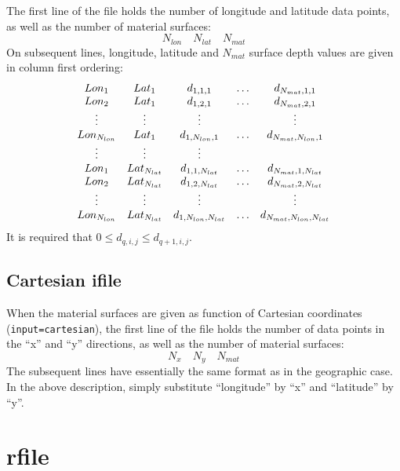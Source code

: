 \documentclass[11pt]{report}
\begin{document}
The first line of the file holds the number of longitude and latitude data points, as well as the number
of material surfaces:
\[
N_{lon}\quad N_{lat}\quad N_{mat}
\]
On subsequent lines, longitude, latitude and $N_{mat}$ surface depth values are given in column
first ordering:
\[
\begin{array}{c c c c c}
Lon_1 & Lat_1          & d_{1,1,1} & \ldots & d_{N_{mat},1,1}\\
Lon_2& Lat_1           & d_{1,2,1} & \ldots & d_{N_{mat},2,1}\\
\vdots&\vdots&\vdots & & \vdots\\
Lon_{N_{lon}}& Lat_1      & d_{1,N_{lon},1} & \ldots & d_{N_{mat},N_{lon},1}\\
\vdots&\vdots&\vdots\\
Lon_1 & Lat_{N_{lat}}     & d_{1,1,N_{lat}} & \ldots & d_{N_{mat},1,N_{lat}}\\
Lon_2& Lat_{N_{lat}}      & d_{1,2,N_{lat}} & \ldots & d_{N_{mat},2,N_{lat}}\\
\vdots&\vdots&\vdots & & \vdots\\
Lon_{N_{lon}}& Lat_{N_{lat}} & d_{1,N_{lon},N_{lat}} & \ldots & d_{N_{mat},N_{lon},N_{lat}}
\end{array}
\]
It is required that $0\leq d_{q,i,j} \leq d_{q+1,i,j}$.

\subsection{Cartesian ifile}

When the material surfaces are given as function of Cartesian coordinates (\verb+input=cartesian+),
the first line of the file holds the number of data points in the ``x'' and ``y'' directions, as
well as the number of material surfaces:
\[
N_{x}\quad N_{y}\quad N_{mat}
\]
The subsequent lines have essentially the same format as in the geographic case. In the above
description, simply substitute ``longitude'' by ``x'' and ``latitude'' by ``y''.


\section{rfile}\label{sec:rfile-format}
\end{document}
